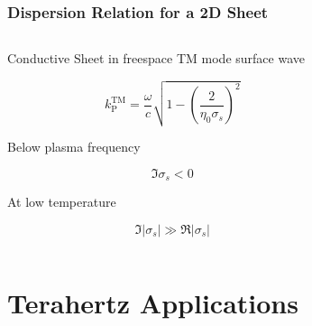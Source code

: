 \documentclass[10pt]{beamer}
\renewcommand{\O}{\omega}  %
\begin{document}
\begin{frame}
    \frametitle{Dispersion Relation for a 2D Sheet}
    \begin{columns}[T] %
        \begin{column}{.5\textwidth}
            \begin{outline}[itemize]
                \1 Conductive Sheet in freespace
                \1 TM mode surface wave
            \end{outline}
            \begin{equation} \nonumber
                k^{\mathrm{TM}}_{\mathrm P} = \frac{\O}{c} \sqrt{1 - \left(\frac{2}{\eta_0 \sigma_s}\right)^2}
                \label{eq:TM_pole}%
            \end{equation}
            \begin{outline}[itemize]
                \1 Below plasma frequency
            \end{outline}
            \begin{equation} \nonumber
                \Im \sigma_s < 0
                \label{eq:2deg_surface_wave}%
            \end{equation}%
            \begin{outline}[itemize]
                \1 At low temperature
            \end{outline}%
            \begin{equation} \nonumber
                \Im |\sigma_s| \gg \Re |\sigma_s|
                \label{eq:2deg_low_loss}
            \end{equation}
        \end{column}
        \begin{column}[T]{.45\textwidth}
            \centering
            \begin{figure}

            \end{figure}
        \end{column}
    \end{columns}
\end{frame}

\section{Terahertz Applications}
\end{document}
